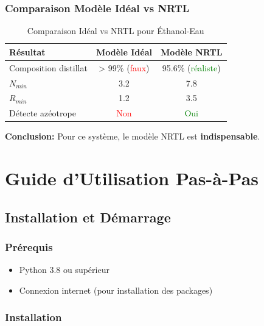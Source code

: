 \documentclass[11pt,a4paper]{article}
\begin{document}
\subsubsection{Comparaison Modèle Idéal vs NRTL}

\begin{table}[h]
\centering
\begin{tabular}{lcc}
\toprule
\textbf{Résultat} & \textbf{Modèle Idéal} & \textbf{Modèle NRTL} \\
\midrule
Composition distillat & > 99\% (\textcolor{red}{faux}) & 95.6\% (\textcolor{green}{réaliste}) \\
$N_{min}$ & 3.2 & 7.8 \\
$R_{min}$ & 1.2 & 3.5 \\
Détecte azéotrope & \textcolor{red}{Non} & \textcolor{green}{Oui} \\
\bottomrule
\end{tabular}
\caption{Comparaison Idéal vs NRTL pour Éthanol-Eau}
\end{table}

\textbf{Conclusion:} Pour ce système, le modèle NRTL est \textbf{indispensable}.

\section{Guide d'Utilisation Pas-à-Pas}

\subsection{Installation et Démarrage}

\subsubsection{Prérequis}

\begin{itemize}[leftmargin=*]
    \item Python 3.8 ou supérieur
    \item Connexion internet (pour installation des packages)
\end{itemize}

\subsubsection{Installation}
\end{document}
